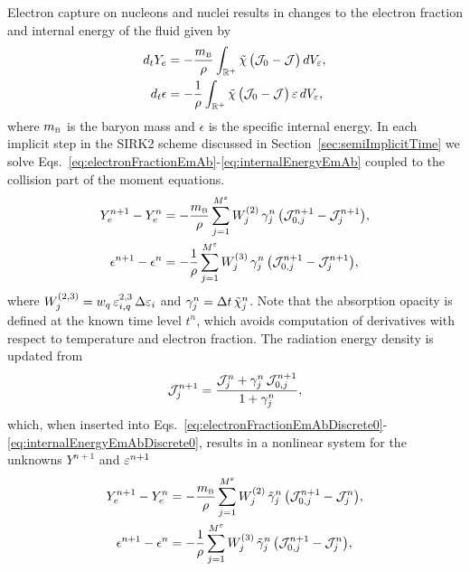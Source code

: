 \documentclass[10pt,preprint]{aastex}
\begin{document}
Electron capture on nucleons and nuclei results in changes to the electron fraction and internal energy of the fluid given by
\begin{align}
  d_{t}Y_{e}
  &=-\frac{m_{\mbox{\tiny B}}}{\rho}\int_{\mathbb{R}^{+}}\tilde{\chi}\,\big(\mathcal{J}_{0}-\mathcal{J}\big)\,dV_{\varepsilon}, \label{eq:electronFractionEmAb} \\
  d_{t}\epsilon
  &=-\frac{1}{\rho}\int_{\mathbb{R}^{+}}\tilde{\chi}\,\big(\mathcal{J}_{0}-\mathcal{J}\big)\,\varepsilon\,dV_{\varepsilon}, \label{eq:internalEnergyEmAb}
\end{align}
where $m_{\mbox{\tiny B}}$ is the baryon mass and $\epsilon$ is the specific internal energy.  
In each implicit step in the SIRK2 scheme discussed in Section~\ref{sec:semiImplicitTime} we solve Eqs.~\eqref{eq:electronFractionEmAb}-\eqref{eq:internalEnergyEmAb} coupled to the collision part of the moment equations.  
\begin{align}
  Y_{e}^{n+1}-Y_{e}^{n}
  &=-\frac{m_{\mbox{\tiny B}}}{\rho}\sum_{j=1}^{M^{\varepsilon}}W_{j}^{(2)}\,\gamma_{j}^{n}\,\big(\mathcal{J}_{0,j}^{n+1}-\mathcal{J}_{j}^{n+1}\big), \label{eq:electronFractionEmAbDiscrete0} \\
  \epsilon^{n+1}-\epsilon^{n}
  &=-\frac{1}{\rho}\sum_{j=1}^{M^{\varepsilon}}W_{j}^{(3)}\,\gamma_{j}^{n}\,\big(\mathcal{J}_{0,j}^{n+1}-\mathcal{J}_{j}^{n+1}\big), \label{eq:internalEnergyEmAbDiscrete0}
\end{align}
where $W_{j}^{(2,3)}=w_{q}\,\varepsilon_{i,q}^{2,3}\,\Delta\varepsilon_{i}$ and $\gamma_{j}^{n}=\Delta t\,\tilde{\chi}_{j}^{n}$.  
Note that the absorption opacity is defined at the known time level $t^{n}$, which avoids computation of derivatives with respect to temperature and electron fraction.  
The radiation energy density is updated from
\begin{equation}
  \mathcal{J}_{j}^{n+1}=\frac{\mathcal{J}_{j}^{n}+\gamma_{j}^{n}\,\mathcal{J}_{0,j}^{n+1}}{1+\gamma_{j}^{n}}, 
  \label{eq:momentEquationEnergyEmAbDiscrete}
\end{equation}
which, when inserted into Eqs.~\eqref{eq:electronFractionEmAbDiscrete0}-\eqref{eq:internalEnergyEmAbDiscrete0}, results in a nonlinear system for the unknowns $Y^{n+1}$ and $\varepsilon^{n+1}$
\begin{align}
  Y_{e}^{n+1}-Y_{e}^{n}
  &=-\frac{m_{\mbox{\tiny B}}}{\rho}\sum_{j=1}^{M^{\varepsilon}}W_{j}^{(2)}\,\tilde{\gamma}_{j}^{n}\,\big(\mathcal{J}_{0,j}^{n+1}-\mathcal{J}_{j}^{n}\big), \label{eq:electronFractionEmAbDiscrete} \\
  \epsilon^{n+1}-\epsilon^{n}
  &=-\frac{1}{\rho}\sum_{j=1}^{M^{\varepsilon}}W_{j}^{(3)}\,\tilde{\gamma}_{j}^{n}\,\big(\mathcal{J}_{0,j}^{n+1}-\mathcal{J}_{j}^{n}\big), \label{eq:internalEnergyEmAbDiscrete}
\end{align}
\end{document}
